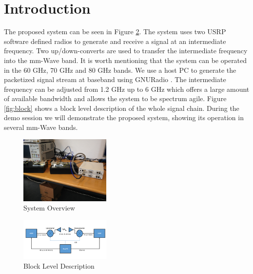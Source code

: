 \documentclass{acm_proc_article-sp}
\begin{document}



\section{Introduction}
The proposed system can be seen in Figure \ref{fig:system}. The system uses two USRP \cite{ettus} software defined radios to generate and receive a signal at an intermediate frequency. Two up/down-converts are used to transfer the intermediate frequency into the mm-Wave band. It is worth mentioning that the system can be operated in the 60 GHz, 70 GHz and 80 GHz bands.
We use a host PC to generate the packetized signal stream at baseband using GNURadio \cite{gnuradio}. The intermediate frequency can be adjusted from 1.2 GHz up to 6 GHz which offers a large amount of available bandwidth and allows the system to be spectrum agile. Figure \ref{fig:block} shows a block level description of the whole signal chain.
During the demo session we will demonstrate the proposed system, showing its operation in several mm-Wave bands.
\begin{figure}
\center
\includegraphics[width=0.4\textwidth]{system.jpg}
\caption{System Overview}
\label{fig:system}
\end{figure}
\begin{figure}
\center
\includegraphics[width=0.4\textwidth]{block-diagram}
\caption{Block Level Description}
\label{fig:system}
\end{figure}



\end{document}
